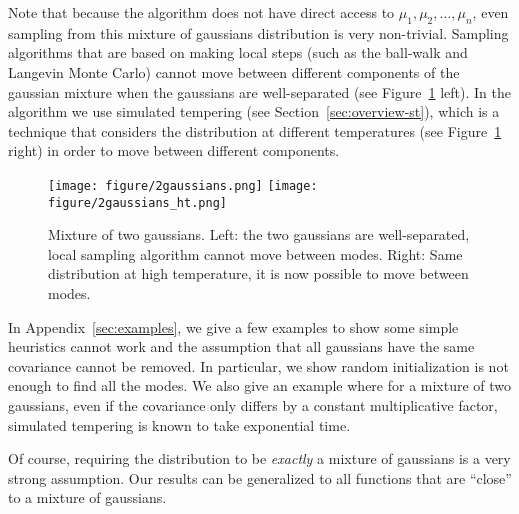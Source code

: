 Note that because the algorithm does not have direct access to $\mu_1, \mu_2, \ldots, \mu_n$, even sampling from this mixture of gaussians distribution is very non-trivial. Sampling algorithms that are based on making local steps (such as the ball-walk \cite{lovasz1993random,vempala2005geometric} and Langevin Monte Carlo) cannot move between different components of the gaussian mixture when the gaussians are well-separated (see Figure~\ref{fig:mix} left). In the algorithm we use simulated tempering (see Section~\ref{sec:overview-st}), which is a technique that considers the distribution at different temperatures (see Figure~\ref{fig:mix} right) in order to move between different components.

\begin{figure}
\centering
\texttt{[image: figure/2gaussians.png]}
\texttt{[image: figure/2gaussians\_ht.png]}
\caption{Mixture of two gaussians. Left: the two gaussians are well-separated, local sampling algorithm cannot move between modes. Right: Same distribution at high temperature, it is now possible to move between modes.}
\label{fig:mix}
\end{figure}

In Appendix~\ref{sec:examples}, we give a few examples to show some simple heuristics cannot work and the assumption that all gaussians have the same covariance cannot be removed. In particular, we show random initialization is not enough to find all the modes. We also give an example where for a mixture of two gaussians, even if the covariance only differs by a constant multiplicative factor, simulated tempering is known to take exponential time.

Of course, requiring the distribution to be {\em exactly} a mixture of gaussians is a very strong assumption. Our results can be generalized to all functions that are ``close'' to a mixture of gaussians.

